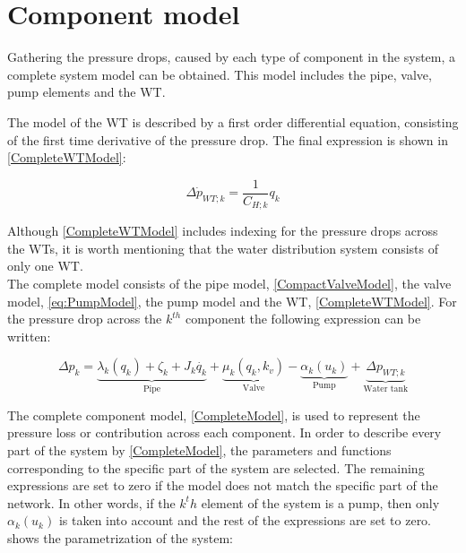 \section{Component model} 
\label{CompleteSystemModel}
Gathering the pressure drops, caused by each type of component in the system, a complete system model can be obtained. This model includes the pipe, valve, pump elements and the WT. 

The model of the WT is described by a first order differential equation, consisting of the first time derivative of the pressure drop. The final expression is shown in \eqref{CompleteWTModel}:

\begin{equation}
  \label{CompleteWTModel}
  \Delta \dot{p}_{WT;k} = \frac{1}{C_{H;k}} q_k 
\end{equation}

Although \eqref{CompleteWTModel} includes indexing for the pressure drops across the WTs, it is worth mentioning that the water distribution system consists of only one WT.
\\
The complete model consists of the pipe model, \eqref{CompactValveModel}, the valve model, \eqref{eq:PumpModel}, the pump model and the WT, \eqref{CompleteWTModel}. For the pressure drop across the $k^{th}$ component the following expression can be written: 

%

\begin{equation}
\label{CompleteModel}
\Delta p_k = \underbrace{\lambda_k (q_k) + \zeta_k + J_k \dot{q_k}}_\text{Pipe} + \underbrace{\mu_k (q_k, k_v)}_\text{Valve} - \underbrace{\alpha_k(u_k)}_\text{Pump} + \underbrace{\Delta p_{WT;k}}_\text{Water tank}
\end{equation}

The complete component model, \eqref{CompleteModel}, is used to represent the pressure loss or contribution across each component. In order to describe every part of the system by \eqref{CompleteModel}, the parameters and functions corresponding to the specific part of the system are selected. The remaining expressions are set to zero if the model does not match the specific part of the network. In other words, if the $k^th$ element of the system is a pump, then only $\alpha_k(u_k)$ is taken into account and the rest of the expressions are set to zero. 
 shows the parametrization of the system: 

